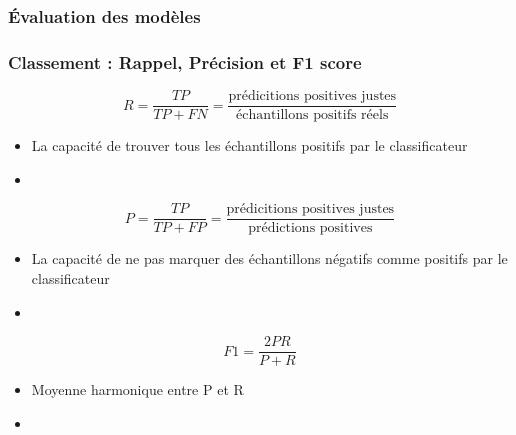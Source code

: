 \documentclass[xcolor=table]{beamer}
\begin{document}
\begin{frame}
	\frametitle{Évaluation des modèles}
	\frametitle{Classement : Rappel, Précision et F1 score}
	
	\vspace{-6pt}
	\[R = \frac{TP}{TP + FN} = \frac{\text{prédicitions positives justes}}{\text{échantillons positifs réels}}\]
	
	\begin{itemize}
		\item La capacité de trouver tous les échantillons positifs par le classificateur
		\item {}
	\end{itemize}
	
	\vspace{-6pt}
	\[P = \frac{TP}{TP + FP} = \frac{\text{prédicitions positives justes}}{\text{prédictions positives}}\]
	
	\begin{itemize}
		\item La capacité de ne pas marquer des échantillons négatifs comme positifs par le classificateur
		\item {}
	\end{itemize}
	
	\vspace{-6pt}
	\[F1 = \frac{2 P R}{P + R}\]
	
	\begin{itemize}
		\item Moyenne harmonique entre P et R
		\item {}
	\end{itemize}
	
\end{frame}
\end{document}
